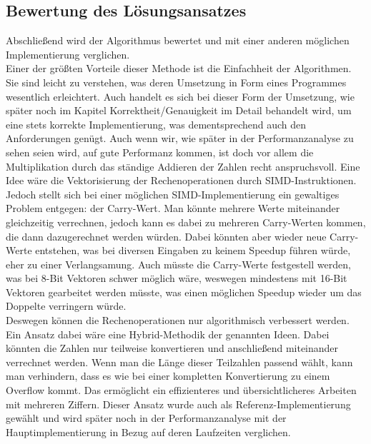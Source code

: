 \documentclass[course=erap]{aspdoc}
\begin{document}
    \subsection{Bewertung des Lösungsansatzes}

    Abschließend wird der Algorithmus bewertet und mit einer anderen möglichen Implementierung verglichen.\\
    \newline
    Einer der größten Vorteile dieser Methode ist die Einfachheit der Algorithmen. Sie sind leicht zu
    verstehen, was deren Umsetzung in Form eines Programmes wesentlich erleichtert. Auch handelt es sich bei dieser
    Form der Umsetzung, wie später noch im Kapitel Korrektheit/Genauigkeit im Detail behandelt wird, um eine stets korrekte
    Implementierung, was dementsprechend auch den Anforderungen genügt. Auch wenn wir, wie später in der Performanzanalyse
    zu sehen seien wird, auf gute Performanz kommen, ist doch vor allem die Multiplikation durch das ständige Addieren der Zahlen recht
    anspruchsvoll. Eine Idee wäre die Vektorisierung der Rechenoperationen durch SIMD-Instruktionen. Jedoch stellt sich bei einer möglichen
    SIMD-Implementierung ein gewaltiges Problem entgegen: der Carry-Wert. Man könnte mehrere Werte miteinander gleichzeitig verrechnen, jedoch
    kann es dabei zu mehreren Carry-Werten kommen, die dann dazugerechnet werden würden. Dabei könnten aber wieder neue Carry-Werte entstehen, was
    bei diversen Eingaben zu keinem Speedup führen würde, eher zu einer Verlangsamung. Auch müsste die Carry-Werte festgestell werden, was bei 8-Bit Vektoren
    schwer möglich wäre, weswegen mindestens mit 16-Bit Vektoren gearbeitet werden müsste, was einen möglichen Speedup wieder um das Doppelte
    verringern würde. \\
    \newline
    Deswegen können die Rechenoperationen nur algorithmisch verbessert werden. Ein Ansatz dabei wäre
    eine Hybrid-Methodik der genannten Ideen. Dabei könnten die Zahlen nur
    teilweise konvertieren und anschließend miteinander verrechnet werden.
    Wenn man die Länge dieser Teilzahlen passend wählt, kann man verhindern, dass es wie bei einer kompletten Konvertierung
    zu einem Overflow kommt. Das ermöglicht ein effizienteres und übersichtlicheres Arbeiten mit mehreren Ziffern. Dieser
    Ansatz wurde auch als Referenz-Implementierung gewählt und wird später noch in der Performanzanalyse
    mit der Hauptimplementierung in Bezug auf deren Laufzeiten verglichen.
\end{document}
